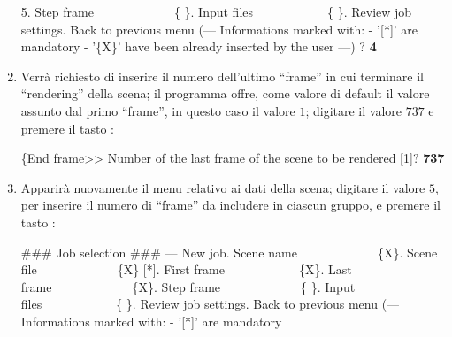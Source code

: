 \begin{enumerate}
\begin{mgCodeBox}
5. Step frame\ \ \ \ \ \ \ \ \ \ \ \ \ \{ \}. Input files\ \ \ \ \ \ \ \ \ \ \ \ \{ \}. Review job settings. Back to previous menu\newline
(---\newline
 Informations marked with:\newline
 - '[*]' are mandatory\newline
 - '\{X\}' have been already inserted by the user\newline
---)\newline
? \textbf{4}
\end{mgCodeBox}
\item Verr\`a richiesto di inserire il numero dell'ultimo ``frame'' in cui terminare il ``rendering'' della scena; il programma offre, come valore di default il valore assunto dal primo ``frame'', in questo caso il valore $1$; digitare il valore $737$ e premere il tasto :
\begin{mgCodeBox}
\small
\{End frame>> Number of the last frame of the scene to be rendered [1]? \textbf{737}
\end{mgCodeBox}
\item \label{lbl:exec-array3-stepframe-useless} Apparir\`a nuovamente il menu relativo ai dati della scena; digitare il valore $5$, per inserire il numero di ``frame'' da includere in ciascun gruppo, e premere il tasto :
\begin{mgCodeBox}
\small
\#\#\# Job selection \#\#\#\newline
--- New job. Scene name\ \ \ \ \ \ \ \ \ \ \ \ \ \{X\}. Scene file\ \ \ \ \ \ \ \ \ \ \ \ \ \{X\} [*]. First frame\ \ \ \ \ \ \ \ \ \ \ \ \{X\}. Last frame\ \ \ \ \ \ \ \ \ \ \ \ \ \{X\}. Step frame\ \ \ \ \ \ \ \ \ \ \ \ \ \{ \}. Input files\ \ \ \ \ \ \ \ \ \ \ \ \{ \}. Review job settings. Back to previous menu\newline
(---\newline
 Informations marked with:\newline
 - '[*]' are mandatory\newline

\end{mgCodeBox}
\end{enumerate}
